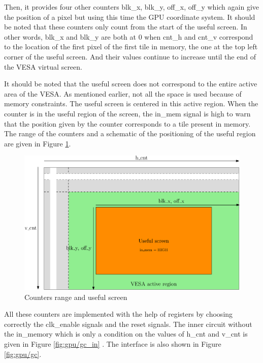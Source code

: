 Then, it provides four other counters blk\_x, blk\_y, off\_x, off\_y which again give the position 
of a pixel but using this time the GPU coordinate system. It should be noted that these counters 
only count from the start of the useful screen. In other words, blk\_x and blk\_y are both at 0 
when cnt\_h and cnt\_v correspond to the location of the first pixel of the first tile in 
memory, the one at the top left corner of the useful screen. And their values continue to increase 
until the end of the VESA virtual screen.

It should be noted that the useful screen does not correspond to the entire active area of the 
VESA. As mentioned earlier, not all the space is used because of memory constraints. The useful 
screen is centered in this active region. When the counter is in the useful region of the screen, 
the in\_mem signal is high to warn that the position given by the counter corresponds to a tile 
present in memory. The range of the counters and a schematic of the positioning of the useful 
region are given in Figure \ref{fig:gpu/gc_screen}.

\begin{figure}[H]
    \centering
    \includegraphics[width=\linewidth]{Chapter4-GPU_CLKU/res/gc_screen}
    \caption{Counters range and useful screen}
    \label{fig:gpu/gc_screen}
\end{figure}

All these counters are implemented with the help of registers by choosing correctly the clk\_enable 
signals and the reset signals. The inner circuit without the in\_memory which is only a condition 
on the values of h\_cnt and v\_cnt is given in Figure \ref{fig:gpu/gc_in}
. The interface is also shown in Figure \ref{fig:gpu/gc}.

